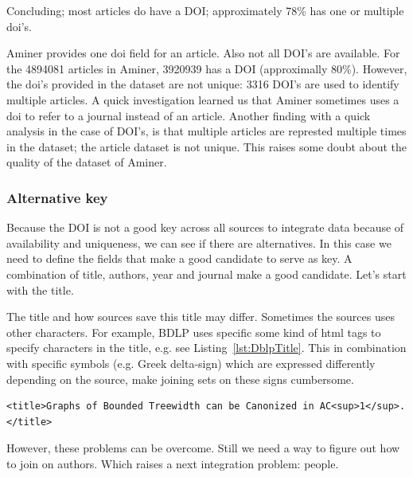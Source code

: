 \documentclass{ou-report}
\begin{document}
Concluding; most articles do have a DOI; approximately 78\% has one or multiple 
doi's.

Aminer provides one doi field for an article. Also not all DOI's are available.
For the 4894081 articles in Aminer, 3920939 has a DOI (approximally 80\%).
However, the doi's provided in the dataset are not unique: 3316 DOI's are used
to identify multiple articles. A quick investigation learned us that Aminer 
sometimes uses a doi to refer to a journal instead of an article. 
Another finding with a quick analysis in the case of DOI's, is that multiple articles
are represted multiple times in the dataset; the article dataset is not unique. This 
raises some doubt about the quality of the dataset of Aminer.

\subsubsection{Alternative key}
Because the DOI is not a good key across all sources to integrate data because 
of
availability and uniqueness, we can see if there are alternatives. In this case
we need to define the fields that make a good candidate to serve as key. 
A combination of title, authors, year and journal make a good candidate.
Let's start with the title. 

The title and how sources save this title may differ. 
Sometimes the sources uses other characters. For example, BDLP uses specific 
some kind of html tags to specify characters in the title, e.g. see 
Listing~\ref{lst:DblpTitle}. This in combination 
with specific symbols (e.g. Greek delta-sign) which are expressed differently 
depending on the source, make joining sets on these signs cumbersome.

\lstset{language=XML}
\begin{lstlisting}[caption={Example title in DBLP},label={lst:DblpTitle}]
<title>Graphs of Bounded Treewidth can be Canonized in AC<sup>1</sup>.</title>
\end{lstlisting}

However, these problems can be overcome. Still we need a way to figure out how 
to join on authors. Which raises a next integration problem: people.

\end{document}
